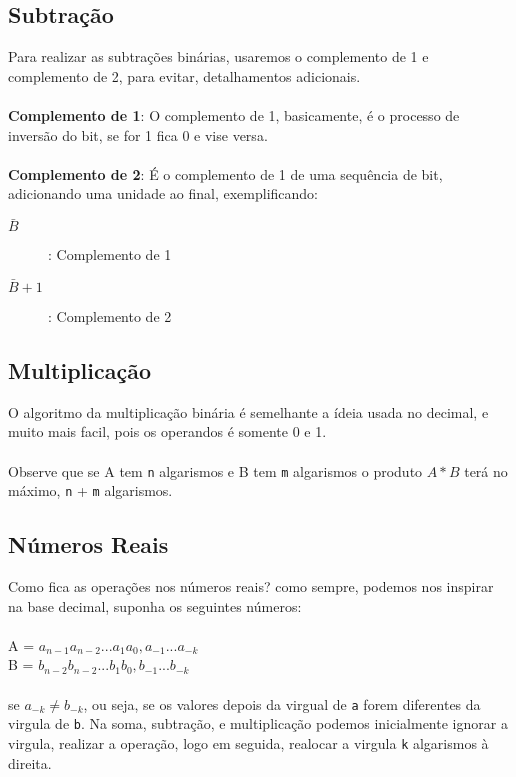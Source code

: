 \documentclass[12pt, onecolumn]{article}
\begin{document}
			\subsection{\centering Subtração}

	Para realizar as subtrações binárias, usaremos o complemento de 1 e complemento
	de 2, para evitar, detalhamentos adicionais.\\
	\\
	\textbf{Complemento de 1}: O complemento de 1, basicamente, é o processo
	de inversão do bit, se for 1 fica 0 e vise versa.\\
	\\
	\textbf{Complemento de 2}: É o complemento de 1 de uma sequência de bit,
	adicionando uma unidade ao final, exemplificando:
	
	\begin{description}
		\item[$\bar{B}$]: Complemento de 1
		\item[$\bar{B} + 1$]: Complemento de 2
	\end{description}

			\subsection{\centering Multiplicação}

	O algoritmo da multiplicação binária é semelhante a ídeia usada no decimal, 
	e muito mais facil, pois os operandos é somente 0 e 1.\\
	\\
	Observe que se A tem \texttt{n} algarismos e B tem \texttt{m} algarismos
	o produto $A * B$ terá no máximo, \texttt{n} + \texttt{m} algarismos.
	
			\subsection{\centering Números Reais}

	Como fica as operações nos números reais? como sempre, podemos nos inspirar na
	base decimal, suponha os seguintes números: \\
	\\
	A = $a_{n-1} a_{n-2} ... a_1 a_0, a_{-1} ... a_{-k}$\\
	B = $b_{n-2} b_{n-2} ... b_1 b_0, b_{-1} ... b_{-k}$\\
	\\
	se $a_{-k} \ne b_{-k}$, ou seja, se os valores depois da virgual de \texttt{a} 
	forem diferentes da virgula de \texttt{b}. Na soma, subtração, e multiplicação
	podemos	inicialmente ignorar a virgula, realizar a operação, logo em seguida, 
	realocar a virgula \texttt{k} algarismos à direita.
\end{document}
